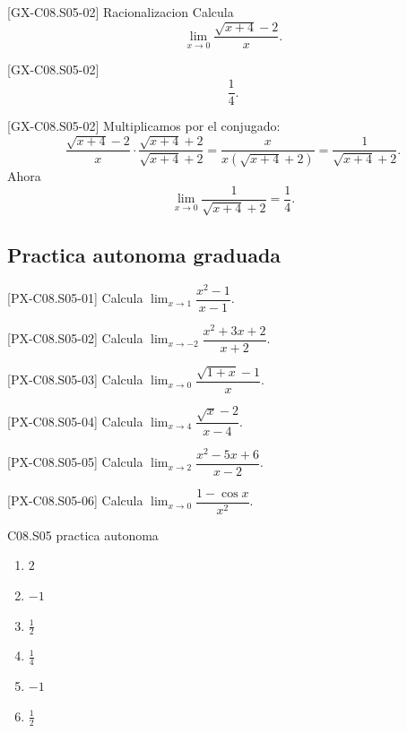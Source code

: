 \begin{guidedexercise}{[GX-C08.S05-02] Racionalizacion}
Calcula
\[
\lim_{x\to 0}\frac{\sqrt{x+4}-2}{x}.
\]
\end{guidedexercise}

\begin{shortanswer}{[GX-C08.S05-02]}
\[
\frac{1}{4}.
\]
\end{shortanswer}

\begin{fullsolution}{[GX-C08.S05-02]}
Multiplicamos por el conjugado:
\[
\frac{\sqrt{x+4}-2}{x}\cdot \frac{\sqrt{x+4}+2}{\sqrt{x+4}+2}
=\frac{x}{x(\sqrt{x+4}+2)}=\frac{1}{\sqrt{x+4}+2}.
\]
Ahora
\[
\lim_{x\to 0}\frac{1}{\sqrt{x+4}+2}=\frac{1}{4}.
\]
\end{fullsolution}

\subsection*{Practica autonoma graduada}
\begin{exercise}{[PX-C08.S05-01] Calcula \(\lim_{x\to 1}\dfrac{x^2-1}{x-1}\).}
\end{exercise}
\begin{exercise}{[PX-C08.S05-02] Calcula \(\lim_{x\to -2}\dfrac{x^2+3x+2}{x+2}\).}
\end{exercise}
\begin{exercise}{[PX-C08.S05-03] Calcula \(\lim_{x\to 0}\dfrac{\sqrt{1+x}-1}{x}\).}
\end{exercise}
\begin{exercise}{[PX-C08.S05-04] Calcula \(\lim_{x\to 4}\dfrac{\sqrt{x}-2}{x-4}\).}
\end{exercise}
\begin{exercise}{[PX-C08.S05-05] Calcula \(\lim_{x\to 2}\dfrac{x^2-5x+6}{x-2}\).}
\end{exercise}
\begin{exercise}{[PX-C08.S05-06] Calcula \(\lim_{x\to 0}\dfrac{1-\cos x}{x^2}\).}
\end{exercise}

\begin{shortanswer}{C08.S05 practica autonoma}
\begin{enumerate}[label=\textbf{PX-C08.S05-\arabic*:}, leftmargin=*]
  \item \(2\)
  \item \(-1\)
  \item \(\frac{1}{2}\)
  \item \(\frac{1}{4}\)
  \item \(-1\)
  \item \(\frac{1}{2}\)
\end{enumerate}
\end{shortanswer}

